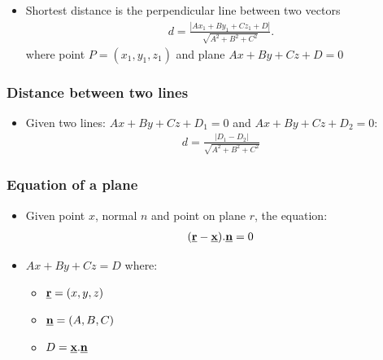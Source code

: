 \documentclass[10pt,a4paper]{article}
\begin{document}
\begin{itemize}
    \item Shortest distance is the perpendicular line between two vectors
    \begin{align*}
        d = \frac{|Ax_1+By_1+Cz_1 +D|}{\sqrt{A^2+B^2+C^2}}.
    \end{align*}
    where point $P=(x_1,y_1,z_1)$ and plane $Ax+By+Cz+D=0$
\end{itemize}

\subsubsection{Distance between two lines}

\begin{itemize}
    \item Given two lines: $Ax + By + Cz + D_1 = 0$ and $Ax + By + Cz + D_2 = 0$:
    \begin{align*}
        d = \frac{|D_1 - D_2|}{\sqrt{A^2 + B^2 + C^2}}
    \end{align*}
\end{itemize}

\subsubsection{Equation of a plane}

\begin{itemize}
    \item Given point $x$, normal $n$ and point on plane $r$, the equation:
    \begin{align*}
        (\textbf{\underline{r}}-\textbf{\underline{x}}).\textbf{\underline{n}} =0 
    \end{align*}
    \item $ Ax+By+Cz = D$ where:
    \begin{itemize}
        \item $\textbf{\underline{r}} = (x,y,z)$
        \item $\textbf{\underline{n}}=(A,B,C)$
        \item $D=\textbf{\underline{x}}.\textbf{\underline{n}}$
    \end{itemize}
    
\end{itemize}
\end{document}
